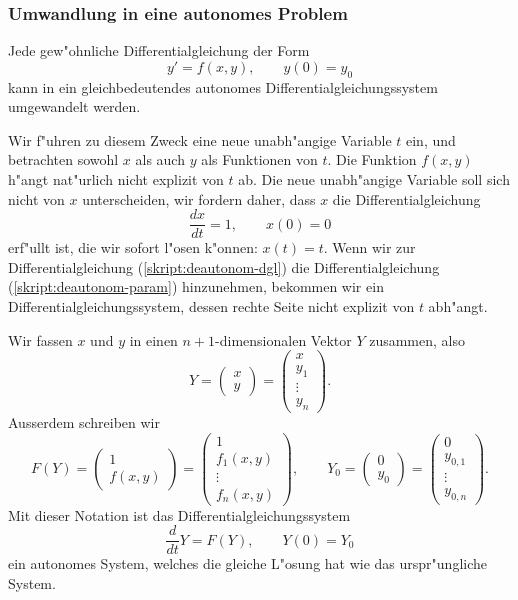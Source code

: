 \subsubsection{Umwandlung in eine autonomes Problem}
Jede gew"ohnliche Differentialgleichung der Form
\begin{equation}
y'=f(x,y), \qquad y(0)=y_0
\label{skript:deautonom-dgl}
\end{equation}
kann in ein gleichbedeutendes autonomes Differentialgleichungssystem
umgewandelt werden.

Wir f"uhren zu diesem Zweck eine neue unabh"angige Variable $t$ ein,
und betrachten sowohl $x$ als auch $y$ als Funktionen von $t$. 
Die Funktion $f(x,y)$ h"angt nat"urlich nicht explizit von $t$ ab.
Die neue unabh"angige Variable soll sich nicht von $x$ unterscheiden,
wir fordern daher, dass $x$ die Differentialgleichung
\begin{equation}
\frac{dx}{dt}=1,\qquad x(0)=0
\label{skript:deautonom-param}
\end{equation}
erf"ullt ist, die wir sofort l"osen k"onnen: $x(t)=t$.
Wenn wir zur Differentialgleichung (\ref{skript:deautonom-dgl}) 
die Differentialgleichung (\ref{skript:deautonom-param}) hinzunehmen,
bekommen wir ein Differentialgleichungssystem, dessen rechte Seite
nicht explizit von  $t$ abh"angt.

Wir fassen $x$ und $y$ in einen $n+1$-dimensionalen Vektor $Y$ zusammen,
also
\[
Y
=
\begin{pmatrix}x\\y\end{pmatrix}
=
\begin{pmatrix}x\\y_1\\\vdots\\y_n\end{pmatrix}.
\]
Ausserdem schreiben wir
\[
F(Y)
=
\begin{pmatrix}1\\f(x,y)\end{pmatrix}
=
\begin{pmatrix}1\\f_1(x,y)\\\vdots\\f_n(x,y)\end{pmatrix},
\qquad
Y_0
=
\begin{pmatrix}0\\y_0\end{pmatrix}
=
\begin{pmatrix}0\\y_{0,1}\\\vdots\\y_{0,n}\end{pmatrix}.
\]
Mit dieser Notation ist das Differentialgleichungssystem
\[
\frac{d}{dt}Y=F(Y),\qquad Y(0)=Y_0
\]
ein autonomes System, welches die gleiche L"osung hat wie das
urspr"ungliche System.


